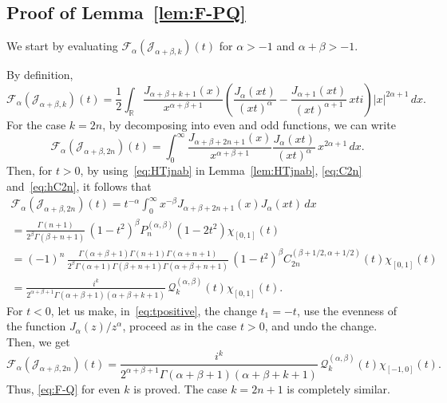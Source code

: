 \documentclass[11pt,a4paper]{amsart}
\theoremstyle{plain}
\theoremstyle{definition}
\newcommand{\R}{\mathbb{R}}
\newcommand{\calF}{\mathcal{F}}
\newcommand{\calJ}{\mathcal{J}}
\newcommand{\calQ}{\mathcal{Q}}
\begin{document}
\subsection{Proof of Lemma~\ref{lem:F-PQ}}
\label{sub:prooflemma}


We start by evaluating $\calF_\alpha (\calJ_{\alpha+\beta,k})(t)$ for $\alpha>-1$ and
$\alpha+\beta>-1$.

By definition,
\begin{equation*}
  \calF_{\alpha}(\calJ_{\alpha+\beta,k})(t)
  = \frac12 \int_{\R} \frac{J_{\alpha+\beta+k+1}(x)}{x^{\alpha+\beta+1}}
  \left( \frac{J_{\alpha}(xt)}{(xt)^{\alpha}}
  - \frac{J_{\alpha+1}(xt)}{(xt)^{\alpha+1}}\,xti\right) |x|^{2\alpha+1}\,dx.
\end{equation*}
For the case $k = 2n$, by decomposing into even and odd functions, we can write
\begin{equation}
\label{eq:tpositive}
  \calF_{\alpha}(\calJ_{\alpha+\beta,2n})(t) =
  \int_{0}^{\infty} \frac{J_{\alpha+\beta+2n+1}(x)}{x^{\alpha+\beta+1}}
  \frac{J_{\alpha}(xt)}{(xt)^{\alpha}}\,x^{2\alpha+1}\,dx.
\end{equation}
Then, for $t>0$, by using~\eqref{eq:HTjnab} in Lemma~\ref{lem:HTjnab},
\eqref{eq:C2n} and~\eqref{eq:hC2n}, it
follows that
\begin{multline*}
  \calF_{\alpha}(\calJ_{\alpha+\beta,2n})(t)
  = t^{-\alpha}
  \int_{0}^{\infty} x^{-\beta} J_{\alpha+\beta+2n+1}(x)J_{\alpha}(xt)\,dx \\
  = \frac{\Gamma(n+1)}{2^{\beta} \Gamma(\beta+n+1)}
  \, (1-t^{2})^{\beta} P_{n}^{(\alpha,\beta)}(1-2t^2) \chi_{[0,1]}(t) \\
  = (-1)^n \, \frac{\Gamma(\alpha+\beta+1) \Gamma(n+1) \Gamma(\alpha+n+1)}{2^{\beta}
  \Gamma(\alpha+1)\Gamma(\beta+n+1)\Gamma(\alpha+\beta+n+1)}
  \, (1-t^{2})^{\beta} C_{2n}^{(\beta+1/2,\alpha+1/2)}(t) \chi_{[0,1]}(t) \\
  = \frac{i^k}{2^{\alpha+\beta+1}\Gamma(\alpha+\beta+1)(\alpha+\beta+k+1)}
  \, \calQ^{(\alpha,\beta)}_{k}(t)\chi_{[0,1]}(t).
\end{multline*}
For $t<0$, let us make, in~\eqref{eq:tpositive}, the
change $t_{1} = -t$, use the evenness of the function
$J_{\alpha}(z)/z^{\alpha}$, %
proceed as in the case $t>0$, and undo the change. Then, we get
\begin{equation*}
  \calF_{\alpha}(\calJ_{\alpha+\beta,2n})(t) 
  = \frac{i^k}{2^{\alpha+\beta+1}\Gamma(\alpha+\beta+1)(\alpha+\beta+k+1)}
  \, \calQ^{(\alpha,\beta)}_{k}(t)\chi_{[-1,0]}(t).
\end{equation*}
Thus, \eqref{eq:F-Q} for even $k$ is proved. The case $k=2n+1$ is completely similar.
\end{document}
